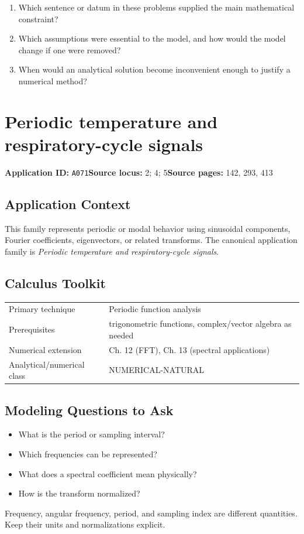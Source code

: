 \documentclass[11pt]{book}
\newcommand{\pid}[1]{\texttt{#1}}
\begin{document}
\begin{reflectionbox}\begin{enumerate}
\item Which sentence or datum in these problems supplied the main mathematical constraint?
\item Which assumptions were essential to the model, and how would the model change if one were removed?
\item When would an analytical solution become inconvenient enough to justify a numerical method?
\end{enumerate}\end{reflectionbox}
\chapter{Periodic temperature and respiratory-cycle signals}\label{app:A071}
\textbf{Application ID:} \pid{A071}\quad \textbf{Source locus:} 2; 4; 5\quad \textbf{Source pages:} 142, 293, 413
\section*{Application Context}
This family represents periodic or modal behavior using sinusoidal components, Fourier coefficients, eigenvectors, or related transforms. The canonical application family is \emph{Periodic temperature and respiratory-cycle signals}.
\section*{Calculus Toolkit}
\begin{tabularx}{\textwidth}{@{}lX@{}}\toprule
Primary technique & Periodic function analysis \\
Prerequisites & trigonometric functions, complex/vector algebra as needed \\
Numerical extension & Ch. 12 (FFT), Ch. 13 (spectral applications) \\
Analytical/numerical class & NUMERICAL-NATURAL \\
\bottomrule\end{tabularx}
\section*{Modeling Questions to Ask}\begin{itemize}
\item What is the period or sampling interval?
\item Which frequencies can be represented?
\item What does a spectral coefficient mean physically?
\item How is the transform normalized?
\end{itemize}
\begin{errorbox}Frequency, angular frequency, period, and sampling index are different quantities. Keep their units and normalizations explicit.\end{errorbox}
\end{document}
